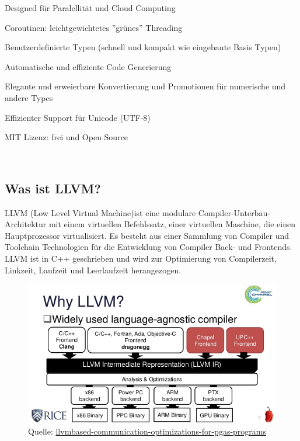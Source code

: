 \documentclass[11pt]{article}
\newcommand{\source}[1]{\caption*{Quelle: {#1}} }
\begin{document}
\endminipage\hfill
\noindent{}

\begin{flushleft}
\begin{compactitem}
\item Designed für Paralellität und Cloud Computing
\item Coroutinen: leichtgewichtetes ''grünes'' Threading
\item Benutzerdefinierte Typen (schnell und kompakt wie eingebaute Basis Typen)
\item Automatische und effiziente Code Generierung
\item Elegante und erweierbare Konvertierung und Promotionen für numerische und andere Types
\item Effizienter Support für Unicode (UTF-8)
\item MIT Lizenz: frei und Open Source
\end{compactitem}
\end{flushleft}

\endminipage\hfill\\
\newpage

\subsection{Was ist LLVM?}
LLVM (Low Level Virtual Machine)ist eine modulare Compiler-Unterbau-Architektur mit einem virtuellen Befehlssatz, einer virtuellen Maschine, die einen Hauptprozessor virtualisiert. Es besteht aus einer Sammlung von Compiler und Toolchain Technologien für die Entwicklung von Compiler Back- und Frontends. LLVM ist in C++ geschrieben und wird zur Optimierung von Compilerzeit, Linkzeit, Laufzeit und Leerlaufzeit herangezogen.\\

\begin{figure}[h]
\begin{center}
\includegraphics[scale=0.5]{llvm.jpg}
\source{\href{https://image.slidesharecdn.com/ahayashi20151115-151115205825-lva1-app6891/95/llvmbased-communication-optimizations-for-pgas-programs-9-638.jpg?cb=1519689486}{llvmbased-communication-optimizations-for-pgas-programs}}
\end{center}
\end{figure}
\end{document}
